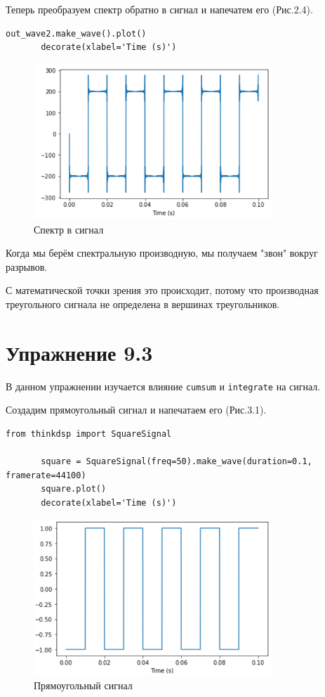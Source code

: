 \documentclass[a4paper,12pt]{report}
\begin{document}
    Теперь преобразуем спектр обратно в сигнал и напечатем его (Рис.2.4).
\begin{lstlisting}[caption=Преобразование спектра в сигнал]
       out_wave2.make_wave().plot()
       decorate(xlabel='Time (s)')
\end{lstlisting}
\begin{figure}[H]
        \centering
        \includegraphics[width=0.8\textwidth]{fig2-4.PNG}
        \caption{Спектр в сигнал}
        \label{fig:fig2-4}
\end{figure}   
       
    Когда мы берём спектральную производную, мы получаем "звон" вокруг разрывов.
    
    С математической точки зрения это происходит, потому что производная треугольного сигнала не определена в вершинах треугольников.
    
\chapter{Упражнение 9.3}
    В данном упражнении изучается влияние \texttt{cumsum} и \texttt{integrate} на сигнал.
    
    Создадим прямоугольный сигнал и напечатаем его (Рис.3.1). 
\begin{lstlisting}[caption=Создание прямоугольного сигнала]
       from thinkdsp import SquareSignal

       square = SquareSignal(freq=50).make_wave(duration=0.1, framerate=44100)
       square.plot()
       decorate(xlabel='Time (s)')
\end{lstlisting}
\begin{figure}[H]
        \centering
        \includegraphics[width=0.8\textwidth]{fig3-1.PNG}
        \caption{Прямоугольный сигнал}
        \label{fig:fig3-1}
\end{figure} 
\end{document}
